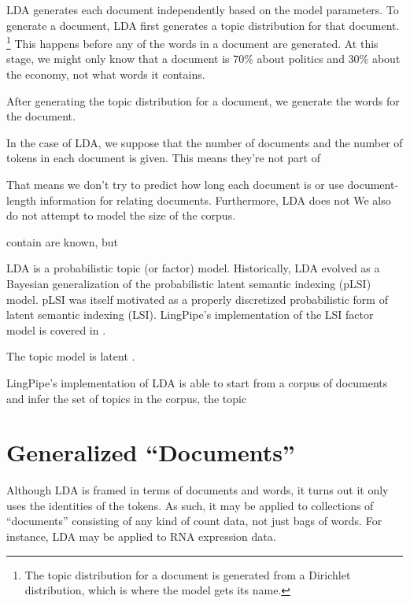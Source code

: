 LDA generates each document independently based on the model
parameters.  To generate a document, LDA first generates a topic
distribution for that document.%
%
\footnote{The topic distribution for a document is generated from
a Dirichlet distribution, which is where the model gets its name.}
%
This happens before any of the words in a document are generated.  At
this stage, we might only know that a document is 70\% about politics
and 30\% about the economy, not what words it contains.

After generating the topic distribution for a document, we generate
the words for the document.  

In the case of LDA, we suppose that the number of documents and the
number of tokens in each document is given.  This means they're
not part of 

That means we don't try
to predict how long each document is or use document-length
information for relating documents.  Furthermore, LDA does not We also do not attempt to model
the size of the corpus.


contain are known, but 


LDA is a probabilistic topic (or factor) model.  Historically, LDA
evolved as a Bayesian generalization of the probabilistic latent
semantic indexing (pLSI) model.  pLSI was itself motivated as a
properly discretized probabilistic form of latent semantic indexing
(LSI).  LingPipe's implementation of the LSI factor model is covered
in .

The topic model is latent .

LingPipe's implementation of LDA is able to start from a corpus of
documents and infer the set of topics in the corpus, the topic



\section{Generalized ``Documents''}

Although LDA is framed in terms of documents and words, it turns out
it only uses the identities of the tokens.  As such, it may be applied
to collections of ``documents'' consisting of any kind of count data,
not just bags of words.  For instance, LDA may be applied to RNA
expression data.

